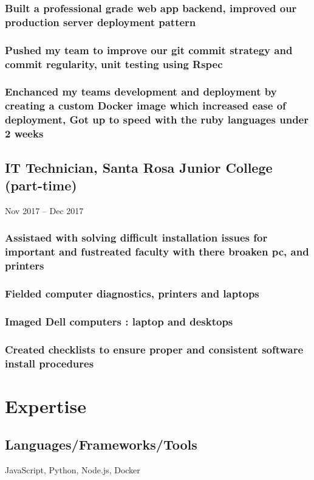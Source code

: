 \documentclass{article}
\begin{document}
	        \subsubsection{Built a professional grade web app backend, improved our production server deployment pattern}
            \subsubsection{Pushed my team to improve our git commit strategy and commit regularity, unit testing using Rspec}
            \subsubsection{Enchanced my teams development and deployment by creating a custom Docker image which increased ease of deployment, Got up to speed with the ruby languages under 2 weeks}
            
    \subsection{IT Technician, Santa Rosa Junior College (part-time)}Nov 2017 – Dec 2017
        
        \vspace{-2mm}
    	\subsubsection{Assistaed with solving difficult installation issues for important and fustreated faculty with there broaken pc, and printers  }
    	\subsubsection{Fielded computer diagnostics, printers and laptops }
    	\subsubsection{Imaged Dell computers : laptop and desktops }
    	\subsubsection{Created checklists to ensure proper and consistent software install procedures}

\section{Expertise}
		\subsection{Languages/Frameworks/Tools}
		JavaScript, Python, Node.js, Docker
\end{document}
